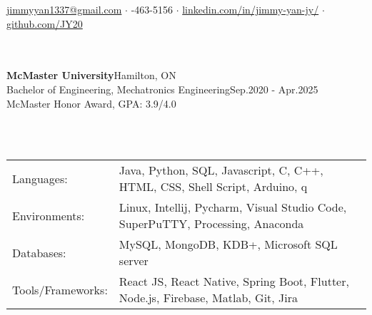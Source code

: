 \documentclass[a4paper]{article}
\newcommand{\lineunder} {
    \vspace*{-8pt} \\
    \hspace*{-18pt} \hrulefill \\
}
\newcommand{\header} [1] {
    {\hspace*{-18pt}\vspace*{6pt} \textsc{#1}}
    \vspace*{-6pt} \lineunder
}
\begin{document}
\vspace*{-40pt}

\vspace*{-10pt}
\begin{center}
	\vspace{1mm}
	\color{black}
	\faSend \space \normalsize
	\href{mailto:jimmyyan1337@gmail.com}{jimmyyan1337@gmail.com} $\cdot$ 
	\faPhoneSquare {}-463-5156 $\cdot$ \faLinkedinSquare \space \href{https://www.linkedin.com/in/jimmy-yan-jy/}{linkedin.com/in/jimmy-yan-jy/}
	$\cdot$  
	\faGithub \space \href{https://github.com/JY20}{github.com/JY20}
	\\
\end{center}
\vspace{-2mm}
\header{\textbf{}}
\normalsize
\textbf{McMaster University}\hfill Hamilton, ON\\
Bachelor of Engineering, Mechatronics Engineering\hfill Sep.2020 - Apr.2025
\\McMaster Honor Award, GPA: 3.9/4.0\\
\vspace{1mm}

\header{\textbf{}}
\normalsize
\begin{tabular}{ l l }
	Languages:        & Java, Python, SQL, Javascript, C, C++, HTML, CSS, Shell Script, Arduino, q     \\
	Environments:     & Linux, Intellij, Pycharm, Visual Studio Code, SuperPuTTY, Processing, Anaconda \\
	Databases: &   MySQL, MongoDB, KDB+, Microsoft SQL server \\
	Tools/Frameworks:      & React JS, React Native, Spring Boot, Flutter, Node.js, Firebase, Matlab, Git, Jira\\
\end{tabular}
\vspace{1mm}
\end{document}
